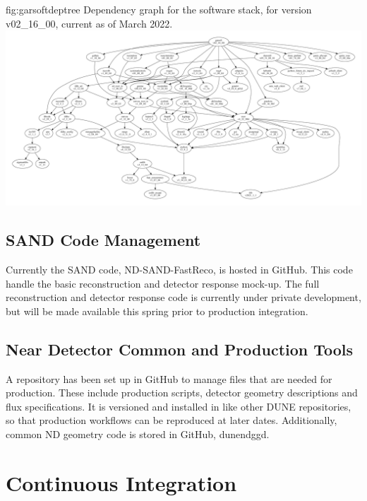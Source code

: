 \documentclass[../main-v1.tex]{subfiles}
\begin{document}
\begin{dunefigure}
{fig:garsoftdeptree}
{Dependency graph for the  software stack, for version v02\_16\_00, current as of March 2022.}
\includegraphics[width=\textwidth]{graphics/CodeManagementFigures/garsoft_v02_16_00_graph.pdf}
\end{dunefigure}

\subsection{SAND Code Management}
\label{sec:codemgmt:sand}

Currently the SAND code, ND-SAND-FastReco, is hosted in GitHub. This code handle the basic reconstruction and detector response mock-up. The full reconstruction and detector response code is currently under private development, but will be made available this spring prior to production integration.  

\subsection{Near Detector Common and Production Tools}
\label{sec:codemgmt:ndproduction}

A repository has been set up in GitHub to manage files that are needed for  production.  These include production scripts, detector geometry descriptions and flux specifications.  It is versioned and installed in  like other DUNE repositories, so that production workflows can be reproduced at later dates. Additionally, common ND geometry code is stored in GitHub, dunendggd.

\section{Continuous Integration }
\label{sec:codemgmt:ci}
\end{document}
